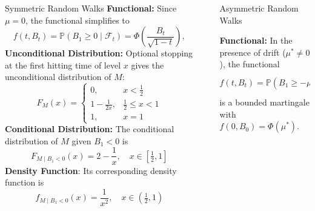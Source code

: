 \documentclass[final]{beamer}
\newlength{\sepwidth}
\newlength{\colwidth}
\newcommand{\separatorcolumn}{\begin{column}{\sepwidth}\end{column}}
\begin{document}
\begin{frame}[t]
\begin{columns}[t]
\begin{column}{\colwidth}
\begin{block}{Symmetric Random Walks}
    \textbf{Functional:} Since $\mu = 0$, the functional simplifies to
    \begin{equation*}
        f(t,B_t) = \mathbb{P}(B_1 \ge 0 \mid \mathcal F_t) 
        = \Phi\!\left(\frac{B_t}{\sqrt{1-t}}\right),
    \end{equation*}
    \textbf{Unconditional Distribution:} Optional stopping at the first hitting time of level $x$ gives the unconditional distribution of $M$:
    \begin{equation*}
        F_M(x) = 
        \begin{cases}
            0, & x < \tfrac12 \\[6pt]
            1 - \tfrac{1}{2x}, & \tfrac12 \le x < 1 \\[6pt]
            1, & x = 1
        \end{cases}
    \end{equation*}
    \textbf{Conditional Distribution:} The conditional distribution of $M$ given $B_1<0$ is
    \begin{equation*}
        F_{M \mid B_1 < 0}(x) = 2 - \frac{1}{x}, \quad x \in [\tfrac12, 1]
    \end{equation*}
    \textbf{Density Function}: Its corresponding density function is
    \begin{equation*}
        f_{M \mid B_1 < 0}(x) = \frac{1}{x^2}, \quad x \in (\tfrac12, 1)
    \end{equation*}

  \end{block}

\end{column}

\separatorcolumn

\begin{column}{\colwidth}

  \begin{block}{Asymmetric Random Walks}

    \textbf{Functional:} In the presence of drift ($\mu^* \neq 0$), the functional
    \begin{equation*}
        f(t,B_t) = \mathbb{P}(B_1 \ge -\mu^* \mid \mathcal F_t)
        = \Phi\!\left(\frac{B_t+\mu^*(1-t)}{\sqrt{1-t}}\right),
    \end{equation*}
    is a bounded martingale with $f(0,B_0)=\Phi(\mu^*)$.


\end{block}
\end{column}
\end{columns}
\end{frame}
\end{document}
